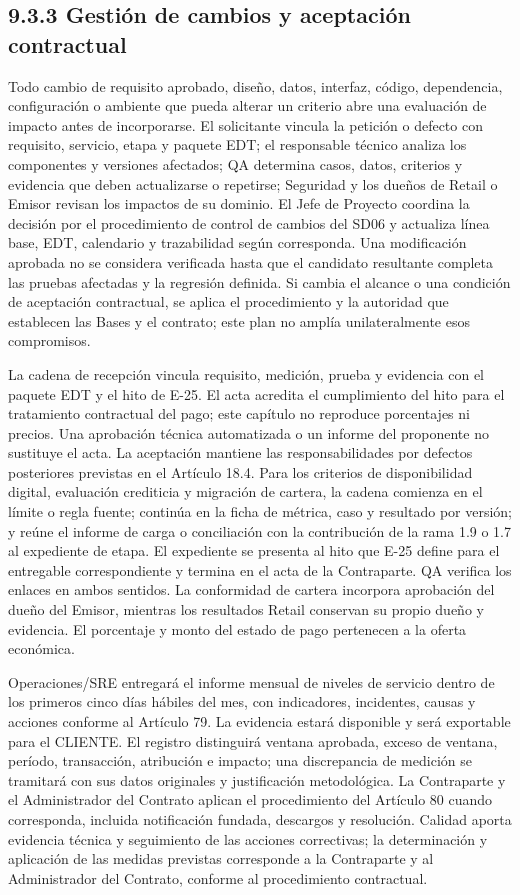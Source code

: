 \documentclass[11pt]{article}
\begin{document}
\subsection{9.3.3 Gestión de cambios y aceptación contractual}

Todo cambio de requisito aprobado, diseño, datos, interfaz, código, dependencia, configuración o ambiente que pueda alterar un criterio abre una evaluación de impacto antes de incorporarse. El solicitante vincula la petición o defecto con requisito, servicio, etapa y paquete EDT; el responsable técnico analiza los componentes y versiones afectados; QA determina casos, datos, criterios y evidencia que deben actualizarse o repetirse; Seguridad y los dueños de Retail o Emisor revisan los impactos de su dominio. El Jefe de Proyecto coordina la decisión por el procedimiento de control de cambios del SD06 y actualiza línea base, EDT, calendario y trazabilidad según corresponda. Una modificación aprobada no se considera verificada hasta que el candidato resultante completa las pruebas afectadas y la regresión definida. Si cambia el alcance o una condición de aceptación contractual, se aplica el procedimiento y la autoridad que establecen las Bases y el contrato; este plan no amplía unilateralmente esos compromisos.

La cadena de recepción vincula requisito, medición, prueba y evidencia con el paquete EDT y el hito de E-25. El acta acredita el cumplimiento del hito para el tratamiento contractual del pago; este capítulo no reproduce porcentajes ni precios. Una aprobación técnica automatizada o un informe del proponente no sustituye el acta. La aceptación mantiene las responsabilidades por defectos posteriores previstas en el Artículo 18.4.
Para los criterios de disponibilidad digital, evaluación crediticia y migración de cartera, la cadena comienza en el límite o regla fuente; continúa en la ficha de métrica, caso y resultado por versión; y reúne el informe de carga o conciliación con la contribución de la rama 1.9 o 1.7 al expediente de etapa. El expediente se presenta al hito que E-25 define para el entregable correspondiente y termina en el acta de la Contraparte. QA verifica los enlaces en ambos sentidos. La conformidad de cartera incorpora aprobación del dueño del Emisor, mientras los resultados Retail conservan su propio dueño y evidencia. El porcentaje y monto del estado de pago pertenecen a la oferta económica.

Operaciones/SRE entregará el informe mensual de niveles de servicio dentro de los primeros cinco días hábiles del mes, con indicadores, incidentes, causas y acciones conforme al Artículo 79. La evidencia estará disponible y será exportable para el CLIENTE. El registro distinguirá ventana aprobada, exceso de ventana, período, transacción, atribución e impacto; una discrepancia de medición se tramitará con sus datos originales y justificación metodológica. La Contraparte y el Administrador del Contrato aplican el procedimiento del Artículo 80 cuando corresponda, incluida notificación fundada, descargos y resolución. Calidad aporta evidencia técnica y seguimiento de las acciones correctivas; la determinación y aplicación de las medidas previstas corresponde a la Contraparte y al Administrador del Contrato, conforme al procedimiento contractual.
\end{document}
